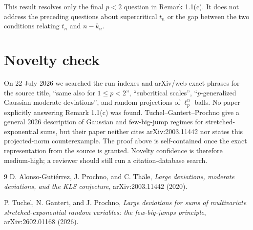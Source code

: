 \documentclass[11pt]{article}
\begin{document}
This result resolves only the final $p<2$ question in Remark 1.1(c).  It does
not address the preceding questions about supercritical $t_n$ or the gap
between the two conditions relating $t_n$ and $n-k_n$.

\section{Novelty check}

On 22 July 2026 we searched the run indexes and arXiv/web exact phrases for
the source title, ``same also for $1\le p<2$'', ``subcritical scales'',
``$p$-generalized Gaussian moderate deviations'', and random projections of
$\ell_p^n$-balls.  No paper explicitly answering Remark 1.1(c) was found.
Tuchel--Gantert--Prochno \cite{TGP2026} give a general 2026 description of
Gaussian and few-big-jump regimes for stretched-exponential sums, but their
paper neither cites arXiv:2003.11442 nor states this projected-norm
counterexample.  The proof above is self-contained once the exact
representation from the source is granted.  Novelty confidence is therefore
medium-high; a reviewer should still run a citation-database search.

\begin{thebibliography}{9}
D. Alonso-Guti\'errez, J. Prochno, and C. Th\"ale,
\emph{Large deviations, moderate deviations, and the KLS conjecture},
arXiv:2003.11442 (2020).

P. Tuchel, N. Gantert, and J. Prochno,
\emph{Large deviations for sums of multivariate stretched-exponential random
variables: the few-big-jumps principle}, arXiv:2602.01168 (2026).
\end{thebibliography}
\end{document}

